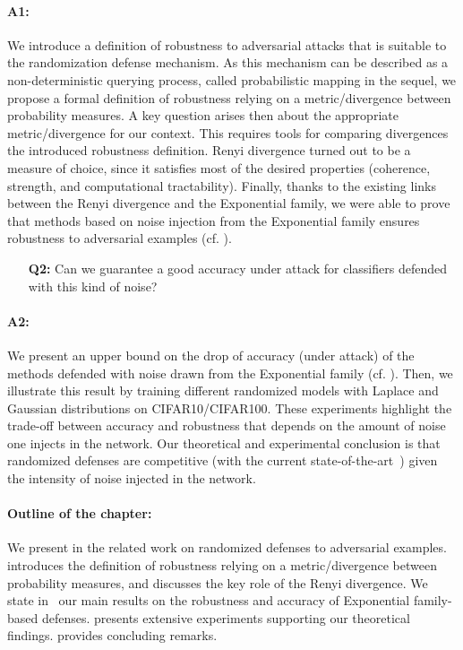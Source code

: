 \paragraph{A1:}
We introduce a definition of robustness to adversarial attacks that is suitable to the randomization defense mechanism.
As this mechanism can be  described as a non-deterministic querying process, called probabilistic mapping in the sequel, we propose a formal definition of robustness relying on a metric/divergence between probability measures.
A key question arises then about the appropriate metric/divergence for our context.
This requires tools for comparing divergences \wrt the introduced robustness definition.
Renyi divergence turned out to be a measure of choice, since it satisfies most of the desired properties  (coherence, strength, and computational tractability).
Finally, thanks to the existing links between the Renyi divergence and the Exponential family, we were able to prove  that methods based on noise injection from the Exponential family  ensures robustness to adversarial examples (cf. ).
\begin{itemize}
    \item[\textbf{Q2:}] Can we guarantee a good accuracy under attack for classifiers defended with this kind of noise? 
\end{itemize}

\paragraph{A2:}
We present an upper bound on  the drop of accuracy (under attack) of the methods defended with noise drawn from the Exponential family (cf. ).
Then, we illustrate this result by training different randomized models with Laplace and Gaussian distributions on CIFAR10/CIFAR100.
These experiments highlight the trade-off between accuracy and robustness that depends on the amount of noise one injects in the network.
Our theoretical and experimental conclusion is that randomized defenses are competitive (with the current state-of-the-art~\cite{madry2018towards}) given the intensity of noise injected in the network.

\paragraph{Outline of the chapter:}
We present in  the related work on randomized defenses to adversarial examples.
 introduces the definition of robustness relying on a metric/divergence between probability measures, and discusses the key role of the Renyi divergence.
We state in~ our main results on the robustness and accuracy of Exponential family-based defenses.
 presents extensive experiments supporting our theoretical findings.
 provides concluding remarks.

